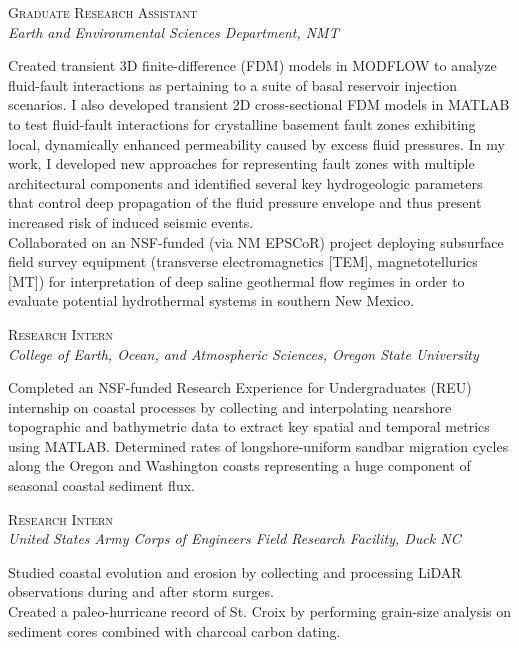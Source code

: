 \documentclass[11pt, letterpaper]{article}
\newcommand{\years}[1]{\marginnote{\scriptsize #1}}
\begin{document}
\years{2016 - 2017}\textsc{Graduate Research Assistant}\\
\textit{Earth and Environmental Sciences Department, NMT}
\begin{adjustwidth}{5pt}{0pt}
	Created transient 3D finite-difference (FDM) models in MODFLOW to analyze fluid-fault interactions as pertaining to a suite of basal reservoir injection scenarios. I also developed transient 2D cross-sectional FDM models in MATLAB to test fluid-fault interactions for crystalline basement fault zones exhibiting local, dynamically enhanced permeability caused by excess fluid pressures. In my work, I developed new approaches for representing fault zones with multiple architectural components and identified several key hydrogeologic parameters that control deep propagation of the fluid pressure envelope and thus present increased risk of induced seismic events.\\
	Collaborated on an NSF-funded (via NM EPSCoR) project deploying subsurface field survey equipment (transverse electromagnetics [TEM], magnetotellurics [MT]) for interpretation of deep saline geothermal flow regimes in order to evaluate potential hydrothermal systems in southern New Mexico.
\end{adjustwidth}

\years{2013}\textsc{Research Intern}\\
\textit{College of Earth, Ocean, and Atmospheric Sciences, Oregon State University}
\begin{adjustwidth}{5pt}{0pt}
	Completed an NSF-funded Research Experience for Undergraduates (REU) internship on coastal processes by collecting and interpolating nearshore topographic and bathymetric data to extract key spatial and temporal metrics using MATLAB. Determined rates of longshore-uniform sandbar migration cycles along the Oregon and Washington coasts representing a huge component of seasonal coastal sediment flux.
\end{adjustwidth}

\years{2013}\textsc{Research Intern}\\
\textit{United States Army Corps of Engineers Field Research Facility, Duck NC}
\begin{adjustwidth}{5pt}{0pt}
	Studied coastal evolution and erosion by collecting and processing LiDAR observations during and after storm surges.\\
	Created a paleo-hurricane record of St. Croix by performing grain-size analysis on sediment cores combined with charcoal carbon dating.
\end{adjustwidth}
\end{document}
